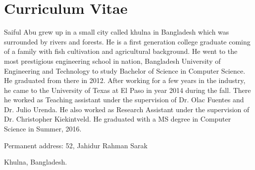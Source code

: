 
\chapter*{Curriculum Vitae}

Saiful Abu grew up in a small city called khulna in Bangladesh which was surrounded by rivers and forests. He is a first generation college graduate coming of a family with fish cultivation and agricultural background. He went to the most prestigious engineering school in nation, Bangladesh University of Engineering and Technology to study Bachelor of Science in Computer Science. He graduated from there in 2012. After working for a few years in the industry, he came to the University of Texas at El Paso in year 2014 during the fall. There he worked as Teaching assistant under the supervision of Dr. Olac Fuentes and Dr. Julio Urenda. He also worked as Research Assistant under the supervision of Dr. Christopher Kiekintveld. He graduated with a MS degree in Computer Science in Summer, 2016. 



\medskip

\noindent
Permanent address: 52, Jahidur Rahman Sarak

\noindent
\hspace{1.42in}
Khulna, Bangladesh.

\vfill



